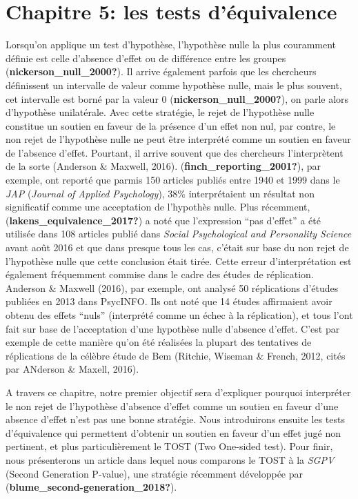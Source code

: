 \documentclass[
  english,
  man]{apa6}
\author{\phantom{0}}
\date{}
\affiliation{\phantom{0}}
\begin{document}
\hypertarget{chapitre-5-les-tests-duxe9quivalence}{%
\section{Chapitre 5: les tests d'équivalence}\label{chapitre-5-les-tests-duxe9quivalence}}

Lorsqu'on applique un test d'hypothèse, l'hypothèse nulle la plus couramment définie est celle d'absence d'effet ou de différence entre les groupes (\textbf{nickerson\_null\_2000?}). Il arrive également parfois que les chercheurs définissent un intervalle de valeur comme hypothèse nulle, mais le plus souvent, cet intervalle est borné par la valeur 0 (\textbf{nickerson\_null\_2000?}), on parle alors d'hypothèse unilatérale. Avec cette stratégie, le rejet de l'hypothèse nulle constitue un soutien en faveur de la présence d'un effet non nul, par contre, le non rejet de l'hypothèse nulle ne peut être interprété comme un soutien en faveur de l'absence d'effet. Pourtant, il arrive souvent que des chercheurs l'interprètent de la sorte (Anderson \& Maxwell, 2016). (\textbf{finch\_reporting\_2001?}), par exemple, ont reporté que parmis 150 articles publiés entre 1940 et 1999 dans le \emph{JAP} (\emph{Journal of Applied Psychology}), 38\% interprétaient un résultat non significatif comme une acceptation de l'hypothès nulle. Plus récemment, (\textbf{lakens\_equivalence\_2017?}) a noté que l'expression ``pas d'effet'' a été utilisée dans 108 articles publié dans \emph{Social Psychological and Personality Science} avant août 2016 et que dans presque tous les cas, c'était sur base du non rejet de l'hypothèse nulle que cette conclusion était tirée. Cette erreur d'interprétation est également fréquemment commise dans le cadre des études de réplication. Anderson \& Maxwell (2016), par exemple, ont analysé 50 réplications d'études publiées en 2013 dans PsycINFO. Ils ont noté que 14 études affirmaient avoir obtenu des effets ``nuls'' (interprété comme un échec à la réplication), et tous l'ont fait sur base de l'acceptation d'une hypothèse nulle d'absence d'effet. C'est par exemple de cette manière qu'on été réalisées la plupart des tentatives de réplications de la célèbre étude de Bem (Ritchie, Wiseman \& French, 2012, cités par ANderson \& Maxell, 2016).

A travers ce chapitre, notre premier objectif sera d'expliquer pourquoi interpréter le non rejet de l'hypothèse d'absence d'effet comme un soutien en faveur d'une absence d'effet n'est pas une bonne stratégie. Nous introduirons ensuite les tests d'équivalence qui permettent d'obtenir un soutien en faveur d'un effet jugé non pertinent, et plus particulièrement le TOST (Two One-sided test). Pour finir, nous présenterons un article dans lequel nous comparons le TOST à la \emph{SGPV} (Second Generation P-value), une stratégie récemment développée par (\textbf{blume\_second-generation\_2018?}).
\end{document}
